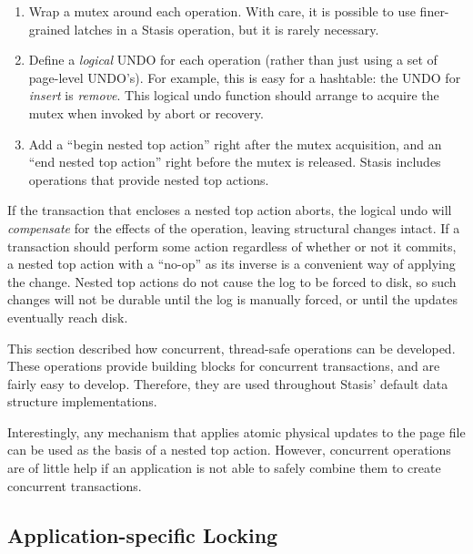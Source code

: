 \documentclass[letterpaper,twocolumn,10pt]{article}
\newcommand{\yad}{Stasis\xspace}
\newcommand{\yads}{Stasis'\xspace}
\begin{document}
\begin{enumerate}
\item Wrap a mutex around each operation.  With care, it is possible 
  to use finer-grained latches in a \yad operation, but it is rarely necessary.
\item Define a {\em logical} UNDO for each operation (rather than just
  using a set of page-level UNDO's).  For example, this is easy for a
  hashtable: the UNDO for {\em insert} is {\em remove}.  This logical
  undo function should arrange to acquire the mutex when invoked by
  abort or recovery.
\item Add a ``begin nested top action'' right after the mutex
  acquisition, and an ``end nested top action'' right before the mutex
  is released.  \yad includes operations that provide nested top
  actions.
\end{enumerate}

If the transaction that encloses a nested top action aborts, the
logical undo will {\em compensate} for the effects of the operation,
leaving structural changes intact.  If a transaction should perform
some action regardless of whether or not it commits, a nested top
action with a ``no-op'' as its inverse is a convenient way of applying
the change.  Nested top actions do not cause the log to be forced to disk, so
such changes will not be durable until the log is manually forced, or
until the updates eventually reach disk.

This section described how concurrent, thread-safe operations can be
developed.  These operations provide building blocks for concurrent
transactions, and are fairly easy to develop.  Therefore, they are
used throughout \yads default data structure implementations.  

Interestingly, any mechanism that applies atomic physical updates to
the page file can be used as the basis of a nested top action.
However, concurrent operations are of little help if an application is
not able to safely combine them to create concurrent transactions.

\subsection{Application-specific Locking}
\end{document}
